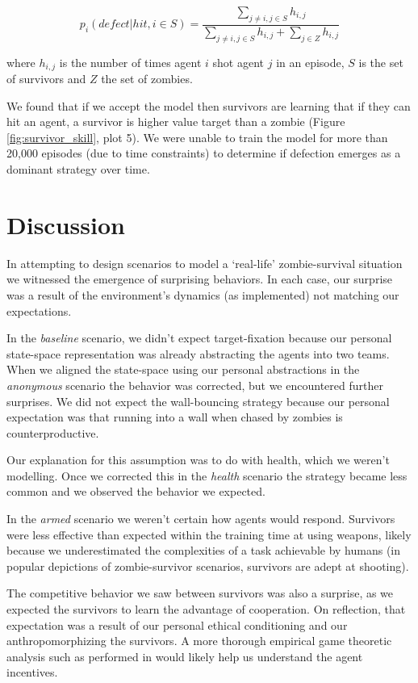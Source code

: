 \documentclass[11pt,a4paper]{article}
\begin{document}
\begin{equation}
  p_i(defect|hit, i\in S) = \frac{
    \sum\limits_{j\neq i, j\in S} h_{i,j}
  }{
    \sum\limits_{j\neq i, j\in S} h_{i,j}
    +
    \sum\limits_{j\in Z} h_{i,j}
  }
\end{equation}

where $h_{i,j}$ is the number of times agent $i$ shot agent $j$ in an episode, $S$ is the set of survivors and $Z$ the set of zombies.

We found that if we accept the model then survivors are learning that if they can hit an agent, a survivor is higher value target than a zombie (Figure \ref{fig:survivor_skill}, plot 5).
We were unable to train the model for more than 20,000 episodes (due to time constraints) to determine if defection emerges as a dominant strategy over time.

\section{Discussion}
\label{sec:discussion}

In attempting to design scenarios to model a `real-life' zombie-survival situation we witnessed the emergence of surprising behaviors.
In each case, our surprise was a result of the environment's dynamics (as implemented) not matching our expectations.

In the \emph{baseline} scenario, we didn't expect target-fixation because our personal state-space representation was already abstracting the agents into two teams.
When we aligned the state-space using our personal abstractions in the \emph{anonymous} scenario the behavior was corrected, but we encountered further surprises.
We did not expect the wall-bouncing strategy because our personal expectation was that running into a wall when chased by zombies is counterproductive.

Our explanation for this assumption was to do with health, which we weren't modelling.
Once we corrected this in the \emph{health} scenario the strategy became less common and we observed the behavior we expected.

In the \emph{armed} scenario we weren't certain how agents would respond.
Survivors were less effective than expected within the training time at using weapons, likely because we underestimated the complexities of a task achievable by humans (in popular depictions of zombie-survivor scenarios, survivors are adept at shooting).

The competitive behavior we saw between survivors was also a surprise, as we expected the survivors to learn the advantage of cooperation.
On reflection, that expectation was a result of our personal ethical conditioning and our anthropomorphizing the survivors.
A more thorough empirical game theoretic analysis such as performed in \citealp{10.5555/3091125.3091194} would likely help us understand the agent incentives.
\end{document}
